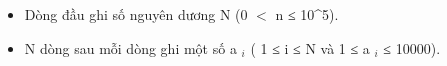 \begin{itemize}
	\item     Dòng đầu ghi số nguyên dương N (0 $<$ n ≤ 10^5).   
	\item     N dòng sau mỗi dòng ghi một số a    $_     i    $    ( 1 ≤ i ≤ N và 1 ≤ a    $_     i    $    ≤ 10000).   
\end{itemize}